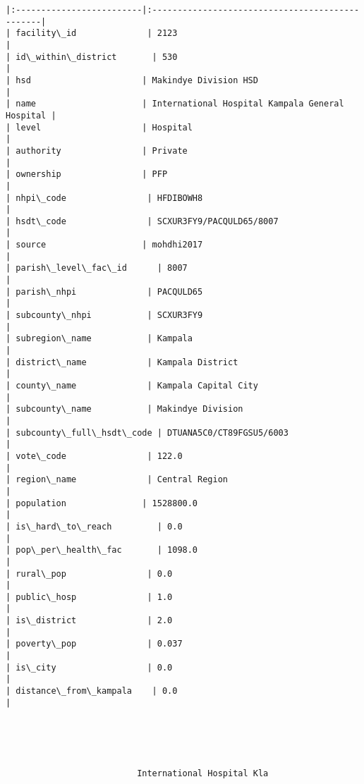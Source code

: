 \documentclass[11pt]{article}
\begin{document}
\begin{Verbatim}[commandchars=\\\{\}]
|:-------------------------|:------------------------------------------------|
| facility\_id              | 2123                                            |
| id\_within\_district       | 530                                             |
| hsd                      | Makindye Division HSD                           |
| name                     | International Hospital Kampala General Hospital |
| level                    | Hospital                                        |
| authority                | Private                                         |
| ownership                | PFP                                             |
| nhpi\_code                | HFDIBOWH8                                       |
| hsdt\_code                | SCXUR3FY9/PACQULD65/8007                        |
| source                   | mohdhi2017                                      |
| parish\_level\_fac\_id      | 8007                                            |
| parish\_nhpi              | PACQULD65                                       |
| subcounty\_nhpi           | SCXUR3FY9                                       |
| subregion\_name           | Kampala                                         |
| district\_name            | Kampala District                                |
| county\_name              | Kampala Capital City                            |
| subcounty\_name           | Makindye Division                               |
| subcounty\_full\_hsdt\_code | DTUANA5C0/CT89FGSU5/6003                        |
| vote\_code                | 122.0                                           |
| region\_name              | Central Region                                  |
| population               | 1528800.0                                       |
| is\_hard\_to\_reach         | 0.0                                             |
| pop\_per\_health\_fac       | 1098.0                                          |
| rural\_pop                | 0.0                                             |
| public\_hosp              | 1.0                                             |
| is\_district              | 2.0                                             |
| poverty\_pop              | 0.037                                           |
| is\_city                  | 0.0                                             |
| distance\_from\_kampala    | 0.0                                             |





                          International Hospital Kla                          


\end{Verbatim}
\end{document}

